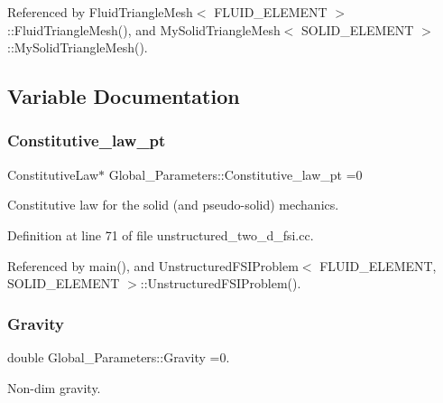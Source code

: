 Referenced by Fluid\+Triangle\+Mesh$<$ F\+L\+U\+I\+D\+\_\+\+E\+L\+E\+M\+E\+N\+T $>$\+::\+Fluid\+Triangle\+Mesh(), and My\+Solid\+Triangle\+Mesh$<$ S\+O\+L\+I\+D\+\_\+\+E\+L\+E\+M\+E\+N\+T $>$\+::\+My\+Solid\+Triangle\+Mesh().



\subsection{Variable Documentation}
\mbox{\label{namespaceGlobal__Parameters_adbd1f040f375c96fe56b3f475f7dbec2}} 
\subsubsection{\texorpdfstring{Constitutive\+\_\+law\+\_\+pt}{Constitutive\_law\_pt}}
{\footnotesize\ttfamily Constitutive\+Law$\ast$ Global\+\_\+\+Parameters\+::\+Constitutive\+\_\+law\+\_\+pt =0}



Constitutive law for the solid (and pseudo-\/solid) mechanics. 



Definition at line 71 of file unstructured\+\_\+two\+\_\+d\+\_\+fsi.\+cc.



Referenced by main(), and Unstructured\+F\+S\+I\+Problem$<$ F\+L\+U\+I\+D\+\_\+\+E\+L\+E\+M\+E\+N\+T, S\+O\+L\+I\+D\+\_\+\+E\+L\+E\+M\+E\+N\+T $>$\+::\+Unstructured\+F\+S\+I\+Problem().

\mbox{\label{namespaceGlobal__Parameters_a335000b5db4206486a116ae0468d2d0c}} 
\subsubsection{\texorpdfstring{Gravity}{Gravity}}
{\footnotesize\ttfamily double Global\+\_\+\+Parameters\+::\+Gravity =0.}



Non-\/dim gravity. 



